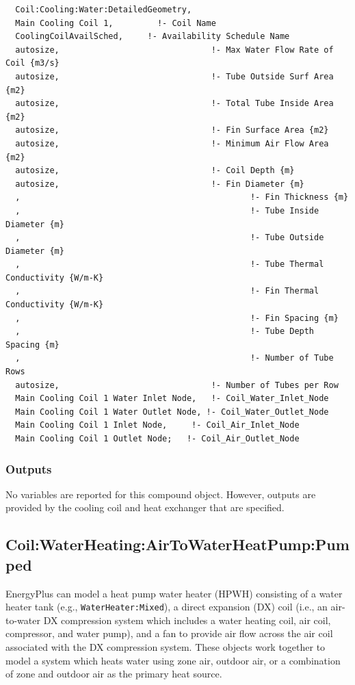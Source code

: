 \begin{lstlisting}
  Coil:Cooling:Water:DetailedGeometry,
  Main Cooling Coil 1,         !- Coil Name
  CoolingCoilAvailSched,     !- Availability Schedule Name
  autosize,                               !- Max Water Flow Rate of Coil {m3/s}
  autosize,                               !- Tube Outside Surf Area {m2}
  autosize,                               !- Total Tube Inside Area {m2}
  autosize,                               !- Fin Surface Area {m2}
  autosize,                               !- Minimum Air Flow Area {m2}
  autosize,                               !- Coil Depth {m}
  autosize,                               !- Fin Diameter {m}
  ,                                               !- Fin Thickness {m}
  ,                                               !- Tube Inside Diameter {m}
  ,                                               !- Tube Outside Diameter {m}
  ,                                               !- Tube Thermal Conductivity {W/m-K}
  ,                                               !- Fin Thermal Conductivity {W/m-K}
  ,                                               !- Fin Spacing {m}
  ,                                               !- Tube Depth Spacing {m}
  ,                                               !- Number of Tube Rows
  autosize,                               !- Number of Tubes per Row
  Main Cooling Coil 1 Water Inlet Node,   !- Coil_Water_Inlet_Node
  Main Cooling Coil 1 Water Outlet Node, !- Coil_Water_Outlet_Node
  Main Cooling Coil 1 Inlet Node,     !- Coil_Air_Inlet_Node
  Main Cooling Coil 1 Outlet Node;   !- Coil_Air_Outlet_Node
\end{lstlisting}

\subsubsection{Outputs}\label{outputs-22}

No variables are reported for this compound object. However, outputs are provided by the cooling coil and heat exchanger that are specified.

\subsection{Coil:WaterHeating:AirToWaterHeatPump:Pumped}\label{coilwaterheatingairtowaterheatpumppumped}

EnergyPlus can model a heat pump water heater (HPWH) consisting of a water heater tank (e.g., \lstinline!WaterHeater:Mixed!), a direct expansion (DX) coil (i.e., an air-to-water DX compression system which includes a water heating coil, air coil, compressor, and water pump), and a fan to provide air flow across the air coil associated with the DX compression system. These objects work together to model a system which heats water using zone air, outdoor air, or a combination of zone and outdoor air as the primary heat source.

